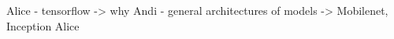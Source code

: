 	 Alice
	- tensorflow -> why	
	 Andi
	 - general architectures of models -> Mobilenet, Inception
	 Alice
